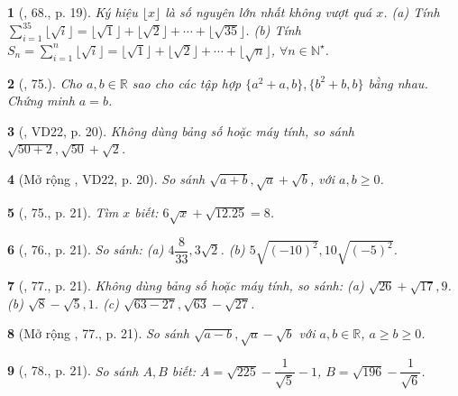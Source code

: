 \documentclass{article}
\newtheorem{baitoan}{}
\begin{document}
\begin{baitoan}[\cite{Binh_Toan_7_tap_1}, 68., p. 19]
	Ký hiệu $\lfloor x\rfloor$ là số nguyên lớn nhất không vượt quá $x$. (a) Tính $\sum_{i=1}^{35} \lfloor\sqrt{i}\rfloor = \lfloor\sqrt{1}\rfloor + \lfloor\sqrt{2}\rfloor + \cdots + \lfloor\sqrt{35}\rfloor$. (b) Tính $S_n = \sum_{i=1}^n \lfloor\sqrt{i}\rfloor = \lfloor\sqrt{1}\rfloor + \lfloor\sqrt{2}\rfloor + \cdots + \lfloor\sqrt{n}\rfloor$, $\forall n\in\mathbb{N}^\star$.
\end{baitoan}

\begin{baitoan}[\cite{Binh_Toan_7_tap_1}, 75.]
	Cho $a,b\in\mathbb{R}$ sao cho các tập hợp $\{a^2 + a,b\},\{b^2 + b,b\}$ bằng nhau. Chứng minh $a = b$.
\end{baitoan}

\begin{baitoan}[\cite{Tuyen_Toan_7}, VD22, p. 20]
	Không dùng bảng số hoặc máy tính, so sánh $\sqrt{50 + 2},\sqrt{50} + \sqrt{2}$.
\end{baitoan}

\begin{baitoan}[Mở rộng \cite{Tuyen_Toan_7}, VD22, p. 20]
	So sánh $\sqrt{a + b},\sqrt{a} + \sqrt{b}$, với $a,b\ge 0$.
\end{baitoan}

\begin{baitoan}[\cite{Tuyen_Toan_7}, 75., p. 21]
	Tìm $x$ biết: $6\sqrt{x} + \sqrt{12.25} = 8$.
\end{baitoan}

\begin{baitoan}[\cite{Tuyen_Toan_7}, 76., p. 21]
	So sánh: (a) $4\dfrac{8}{33},3\sqrt{2}$. (b) $5\sqrt{(-10)^2},10\sqrt{(-5)^2}$.
\end{baitoan}

\begin{baitoan}[\cite{Tuyen_Toan_7}, 77., p. 21]
	Không dùng bảng số hoặc máy tính, so sánh: (a) $\sqrt{26} + \sqrt{17},9$. (b) $\sqrt{8} - \sqrt{5},1$. (c) $\sqrt{63 - 27},\sqrt{63} - \sqrt{27}$.
\end{baitoan}

\begin{baitoan}[Mở rộng \cite{Tuyen_Toan_7}, 77., p. 21]
	So sánh $\sqrt{a - b},\sqrt{a} - \sqrt{b}$ với $a,b\in\mathbb{R}$, $a\ge b\ge 0$.
\end{baitoan}

\begin{baitoan}[\cite{Tuyen_Toan_7}, 78., p. 21]
	So sánh $A,B$ biết: $A = \sqrt{225} - \dfrac{1}{\sqrt{5}} - 1$, $B = \sqrt{196} - \dfrac{1}{\sqrt{6}}$.
\end{baitoan}
\end{document}
